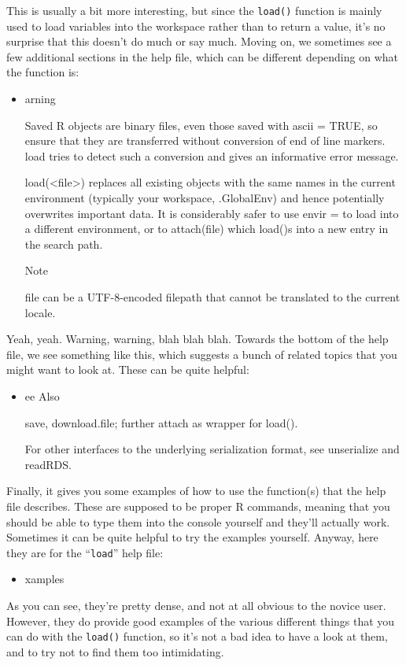 \documentclass[
]{book}
\newenvironment{rmdnote}
  {\begin{rmdblock}}
  {\end{rmdblock}}
\newenvironment{rmdblock}[1]
  {
  \begin{itemize}
  \renewcommand{\labelitemi}{
    \raisebox{-.7\height}[0pt][0pt]{
      {\setkeys{Gin}{width=3em,keepaspectratio}}
    }
  }
  \setlength{\fboxsep}{1em}
  \item
  }
  {
  \end{itemize}
  }
\begin{document}
This is usually a bit more interesting, but since the \texttt{load()} function is mainly used to load variables into the workspace rather than to return a value, it's no surprise that this doesn't do much or say much. Moving on, we sometimes see a few additional sections in the help ﬁle, which can be diﬀerent depending on what the function is:

\begin{rmdnote}
Warning

Saved {R} objects are binary files, even those saved with
ascii = TRUE, so ensure that they are transferred without
conversion of end of line markers. load tries to detect such a
conversion and gives an informative error message.

load(\textless file\textgreater) replaces all existing objects with the same names
in the current environment (typically your workspace,
.GlobalEnv) and hence potentially overwrites important data.
It is considerably safer to use envir = to load into a
different environment, or to attach(file) which
load()s into a new entry in the search path.

Note

file can be a UTF-8-encoded filepath that cannot be translated to
the current locale.
\end{rmdnote}

Yeah, yeah. Warning, warning, blah blah blah. Towards the bottom of the help ﬁle, we see something like this, which suggests a bunch of related topics that you might want to look at. These can be quite helpful:

\begin{rmdnote}
See Also

save, download.file; further
attach as wrapper for load().

For other interfaces to the underlying serialization format, see
unserialize and readRDS.
\end{rmdnote}

Finally, it gives you some examples of how to use the function(s) that the help ﬁle describes. These are supposed to be proper R commands, meaning that you should be able to type them into the console yourself and they'll actually work. Sometimes it can be quite helpful to try the examples yourself. Anyway, here they are for the ``\texttt{load}'' help ﬁle:
\begin{rmdnote}
Examples
\end{rmdnote}

As you can see, they're pretty dense, and not at all obvious to the novice user. However, they do provide good examples of the various diﬀerent things that you can do with the \texttt{load()} function, so it's not a bad idea to have a look at them, and to try not to ﬁnd them too intimidating.
\end{document}
